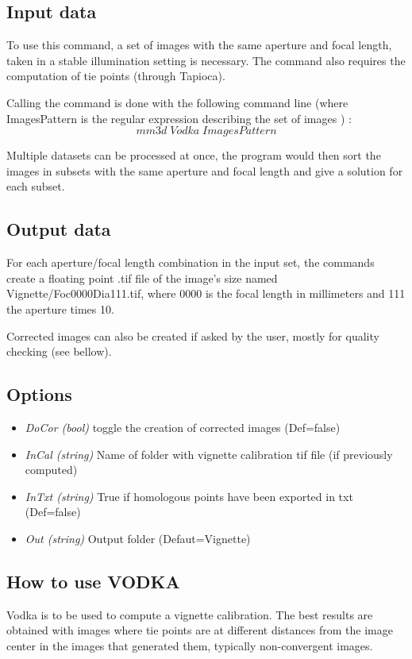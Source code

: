 \subsection{Input data}
To use this command, a set of images with the same aperture and focal length, taken in a stable illumination setting is necessary. The command also requires the computation of tie points (through Tapioca).


Calling the command is done with the following command line (where ImagesPattern is the regular expression describing the set of images ) : \[mm3d\;Vodka\;ImagesPattern\] 

Multiple datasets can be processed at once, the program would then sort the images in subsets with the same aperture and focal length and give a solution for each subset.

\subsection{Output data}
For each aperture/focal length combination in the input set, the commands create a floating point .tif file of the image's size named Vignette/Foc0000Dia111.tif, where 0000 is the focal length in millimeters and 111 the aperture times 10.


Corrected images can also be created if asked by the user, mostly for quality checking (see bellow).


\subsection{Options}
\begin{itemize}
\item{\textit{DoCor (bool)} toggle the creation of corrected images (Def=false)}
\item{\textit{InCal (string)} Name of folder with vignette calibration tif file (if previously computed)}
\item{\textit{InTxt (string)} True if homologous points have been exported in txt (Def=false)}
\item{\textit{Out (string)} Output folder (Defaut=Vignette)}
\end{itemize}

\subsection{How to use VODKA}
Vodka is to be used to compute a vignette calibration. The best results are obtained with images where tie points are at different distances from the image center in the images that generated them, typically non-convergent images.


